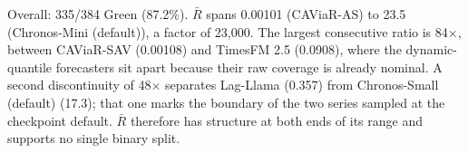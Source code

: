 Overall: 335/384 Green (87.2\%). $\bar R$ spans 0.00101 (CAViaR-AS) to 23.5 (Chronos-Mini (default)), a factor of 23,000. The largest consecutive ratio is 84$\times$, between CAViaR-SAV (0.00108) and TimesFM 2.5 (0.0908), where the dynamic-quantile forecasters sit apart because their raw coverage is already nominal. A second discontinuity of 48$\times$ separates Lag-Llama (0.357) from Chronos-Small (default) (17.3); that one marks the boundary of the two series sampled at the checkpoint default. $\bar R$ therefore has structure at both ends of its range and supports no single binary split.
